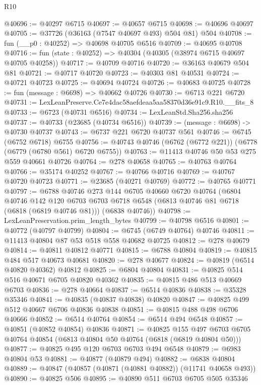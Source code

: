 \begin{lexlean}{R10}
\begin{coremodule}
@40696 := @40297 @6715
@40697 := @40657 @6715
@40698 := @40696 @40697
@40705 := @37726 (@36163 (@7547 @40697 @493) @504 @81) @504
@40708 := fun (__p0 : @40252) => @40698 @40705 @6516
@40709 := @40695 @40708
@40716 := fun (state : @40252) => @40304 (@40305 (@38974 @6715 @40697 @40705 @40258))
@40717 := @40709 @40716
@40720 := @36163 @40679 @504 @81
@40721 := @40717 @40720
@40723 := @40303 @81 @40531
@40724 := @40721 @40723
@40725 := @40694 @40724
@40726 := @40683 @40725
@40728 := fun (message : @6698) => @40662 @40726
@40730 := @6713 @221 @6720
@40731 := LexLeanPreserve.Ce7e4dac58aefdeaa5aa58370d36e91c9.R10.__fits_8
@40733 := @6723 (@40731 @6516)
@40734 := LexLeanStd.Sha256.sha256
@40737 := @40733 (@23685 (@40734 @6516))
@40739 := (message : @6698) -> @40730 @40737
@40743 := @6737 @221 @6720 @40737 @561
@40746 := @6745 (@6752 @6718) @6755
@40756 := @40743 @40746 (@6762 (@6772 @221)) (@6778 (@6779 (@6780 @561) @6720 @6755))
@40763 := @11413 @40746 @50 @53 @275 @559 @40661 @40726
@40764 := @278 @40658
@40765 := @40763 @40764
@40766 := @35174 @40252
@40767 := @40766 @40716
@40769 := @40767 @40720 @40723
@40771 := @23685 (@40271 @40769)
@40772 := @40765 @40771
@40797 := @6788
    @40746
    @273
    @144
    @6705
    @40660
    @6720
    @40764
    (@6804
      @40746
      @142
      @120
      @6703
      @6703
      @6718
      @6548
      (@6813 @40746 @81 @6718 (@6818 (@6819 @40746 @81)))
      (@6838 @40746))
@40798 := LexLeanPreservation.prim_length_bytes
@40799 := @40798 @6516
@40801 := @40772 (@40797 @40799)
@40804 := @6745 (@6749 @40764) @40746
@40811 := @11413 @40804 @87 @53 @518 @558 @40682 @40725
@40812 := @278 @40679
@40814 := @40811 @40812 @40771
@40815 := @6788 @40804
@40819 := @40815 @484 @517 @40673 @40681
@40820 := @278 @40677
@40824 := @40819 (@6514 @40820 @40362) @40812
@40825 := @6804 @40804
@40831 := @40825 @514 @516 @40671 @6705 @40820 @40362
@40835 := @40815 @486 @513 @40669 @6703
@40836 := @278 @40664
@40837 := @6514 @40836
@40838 := @35328 @35346
@40841 := @40835 (@40837 @40838) @40820
@40847 := @40825 @499 @512 @40667 @6706 @40836 @40838
@40851 := @40815 @488 @498 @6706 @40666
@40852 := @6514 @40764
@40854 := @6514 @494 @6548
@40857 := @40851 (@40852 @40854) @40836
@40871 := @40825
    @155
    @497
    @6703
    @6705
    @40764
    @40854
    (@6813 @40804 @50 @40764 (@6818 (@6819 @40804 @50)))
@40877 := @40825 @495 @120 @6703 @6703 @494 @6548
@40879 := @6983 @40804 @53
@40881 := @40877 (@40879 @494)
@40882 := @6838 @40804
@40889 := @40847 (@40857 (@40871 (@40881 @40882)) (@11741 @40658 @493))
@40890 := @40825 @506
@40895 := @40890 @511 @6703 @6705 @505 @35346

\end{coremodule}
\end{lexlean}
